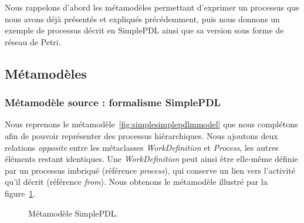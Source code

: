 Nous rappelons d'abord les métamodèles permettant d'exprimer un processus que
nous avons déjà présentés et expliqués précédemment, 
puis nous donnons un exemple de processus décrit en SimplePDL ainsi que sa
version sous forme de réseau de Petri.

\subsection{Métamodèles}

\subsubsection{Métamodèle source : formalisme SimplePDL}

Nous reprenons le métamodèle~\ref{fig:simplesimplepdlmmodel} que nous
complétons afin de pouvoir représenter des processus hiérarchiques.  Nous
ajoutons deux relations \emph{opposite} entre les métaclasses
\emph{WorkDefinition} et \emph{Process}, les autres éléments restant identiques. Une \emph{WorkDefinition} peut ainsi
être elle-même définie par un processus imbriqué (référence \emph{process}),
qui conserve un lien vers l'activité qu'il décrit (référence \emph{from}). Nous
obtenons le métamodèle illustré par la figure~\ref{fig:simplepdlmmodel}.

\begin{figure}[h]%
  \begin{center}
    
    \caption{Métamodèle SimplePDL.}
    \label{fig:simplepdlmmodel}
  \end{center}
\end{figure}



